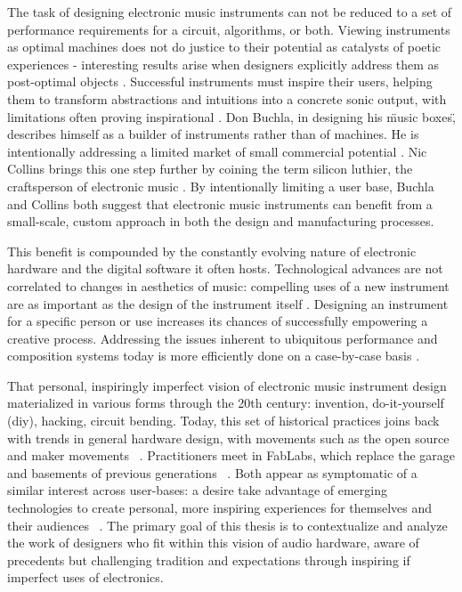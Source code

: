 The task of designing electronic music instruments can not be reduced to a set of performance requirements for a circuit, algorithms, or both. Viewing instruments as optimal machines does not do justice to their potential as catalysts of poetic experiences - interesting results arise when designers explicitly address them as post-optimal objects \citep{dunne2005}. Successful instruments must inspire their users, helping them to transform abstractions and intuitions into a concrete sonic output, with limitations often proving inspirational \citep{evens2005,rovan2009}. Don Buchla, in designing his \"music boxes\", describes himself as a builder of instruments rather than of machines. He is intentionally addressing a limited market of small commercial potential \citep{pinch2001}. Nic Collins brings this one step further by coining the term silicon luthier, the craftsperson of electronic music \citep{collins2008}. By intentionally limiting a user base, Buchla and Collins both suggest that electronic music instruments can benefit from a small-scale, custom approach in both the design and manufacturing processes. 

This benefit is compounded by the constantly evolving nature of electronic hardware and the digital software it often hosts. Technological advances are not correlated to changes in aesthetics of music: compelling uses of a new instrument are as important as the design of the instrument itself \citep{braun2000}. Designing an instrument for a specific person or use increases its chances of successfully empowering a creative process. Addressing the issues inherent to ubiquitous performance and composition systems today is more efficiently done on a case-by-case basis \citep{armstrong2006,haslett2005}. 

That personal, inspiringly imperfect vision of electronic music instrument design materialized in various forms through the 20th century: invention, do-it-yourself (diy), hacking, circuit bending. Today, this set of historical practices joins back with trends in general hardware design, with movements such as the open source and maker movements ~\citep{mellis2014,perner2011}. Practitioners meet in FabLabs, which replace the garage and basements of previous generations ~\citep{mellis2011}. Both appear as symptomatic of a similar interest across user-bases: a desire take advantage of emerging technologies to create personal, more inspiring experiences for themselves and their audiences ~\citep{hermans2014}. The primary goal of this thesis is to contextualize and analyze the work of designers who fit within this vision of audio hardware, aware of precedents but challenging tradition and expectations through inspiring if imperfect uses of electronics.

